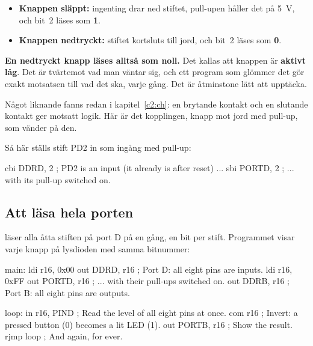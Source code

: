 
\begin{itemize}
  \item \textbf{Knappen släppt:} ingenting drar ned stiftet, pull-upen håller det på 5~V, och
     bit~2 läses som \textbf{1}.
  \item \textbf{Knappen nedtryckt:} stiftet kortsluts till jord, och  bit~2 läses som
    \textbf{0}.
\end{itemize}

\textbf{En nedtryckt knapp läses alltså som noll.} Det kallas att knappen är \textbf{aktivt låg}.
Det är tvärtemot vad man väntar sig, och ett program som glömmer det gör exakt motsatsen till vad
det ska, varje gång. Det är åtminstone lätt att upptäcka.

Något liknande fanns redan i kapitel~\ref{c2:ch}: en brytande kontakt och en slutande kontakt ger
motsatt logik. Här är det kopplingen, knapp mot jord med pull-up, som vänder på den.

Så här ställs stift PD2 in som ingång med pull-up:

\begin{asmcode}
    cbi DDRD, 2                     ; PD2 is an input (it already is after reset) ...
    sbi PORTD, 2                    ; ... with its pull-up switched on.
\end{asmcode}

\subsection{Att läsa hela porten}
\label{c10:b3}
 läser alla åtta stiften på port D på en gång, en bit per stift. Programmet
 visar varje knapp på lysdioden med samma bitnummer:

\begin{asmcode}
main:
    ldi r16, 0x00
    out DDRD, r16                   ; Port D: all eight pins are inputs.
    ldi r16, 0xFF
    out PORTD, r16                  ; ... with their pull-ups switched on.
    out DDRB, r16                   ; Port B: all eight pins are outputs.

loop:
    in r16, PIND                    ; Read the level of all eight pins at once.
    com r16                         ; Invert: a pressed button (0) becomes a lit LED (1).
    out PORTB, r16                  ; Show the result.
    rjmp loop                       ; And again, for ever.
\end{asmcode}

